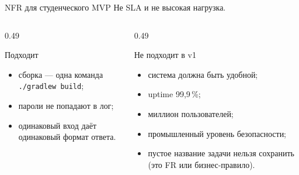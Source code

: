 \begin{frame}{NFR для студенческого MVP}
   Не SLA и не \flqq высокая нагрузка\frqq.

  \medskip
  \begin{columns}[T]
    \begin{column}{0.49\textwidth}
      \begin{block}{Подходит}
        \begin{itemize}\setlength\itemsep{0.28em}
          \item сборка --- одна команда \texttt{./gradlew build};
          \item пароли не попадают в лог;
          \item одинаковый вход даёт одинаковый формат ответа.
        \end{itemize}
      \end{block}
    \end{column}
    \begin{column}{0.49\textwidth}
      \begin{block}{Не подходит в v1}
        \begin{itemize}\setlength\itemsep{0.28em}
          \item \flqq система должна быть удобной\frqq;
          \item uptime 99,9\,\%;
          \item миллион пользователей;
          \item \flqq промышленный уровень безопасности\frqq;
          \item пустое название задачи нельзя сохранить
                (это FR или бизнес-правило).
        \end{itemize}
      \end{block}
    \end{column}
  \end{columns}
\end{frame}
